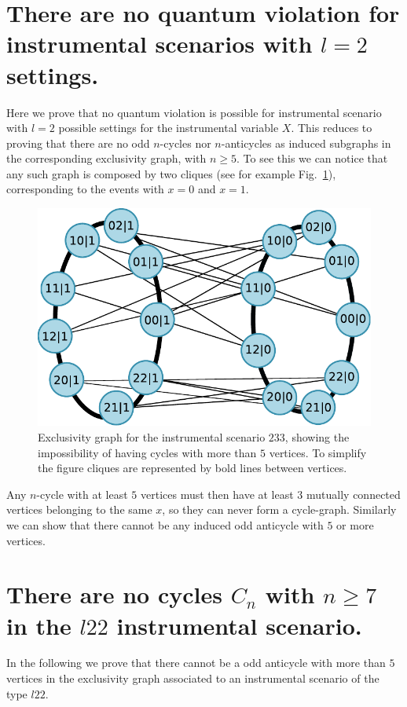 \documentclass[letterpaper]{article}
\begin{document}
\section*{There are no quantum violation for instrumental scenarios with $l=2$
settings.}
Here we prove that no quantum violation is possible for instrumental scenario
with $l=2$ possible settings for the instrumental variable $X$.
This reduces to proving that there are no odd $n$-cycles nor $n$-anticycles as induced
subgraphs in the corresponding exclusivity graph, with $n\ge5$.
To see this we can notice that any such graph is composed by two cliques (see
for example Fig.~\ref{fig:2mn_nocycle_proof}), corresponding to the events with $x=0$ and
$x=1$.
\begin{figure}[t]
    \centering
    \includegraphics[width=.7\columnwidth]{images/nocycles_proof.pdf}
    \caption{Exclusivity graph for the instrumental scenario $233$, showing the
        impossibility of having cycles with more than $5$ vertices. To simplify the figure cliques are
    represented by bold lines between vertices.}
    \label{fig:2mn_nocycle_proof}
\end{figure}
Any $n$-cycle with at least $5$ vertices must then have at least $3$ mutually
connected vertices belonging to the same $x$, so they can never form a
cycle-graph.
Similarly we can show that there cannot be any induced odd anticycle with $5$ or more
vertices.

\section*{There are no cycles $C_n$ with $n \ge 7$ in the $l22$ instrumental scenario.}
In the following we prove that there cannot be a odd anticycle with more than
$5$ vertices in the exclusivity graph associated to an instrumental scenario of
the type $l22$.
\end{document}
